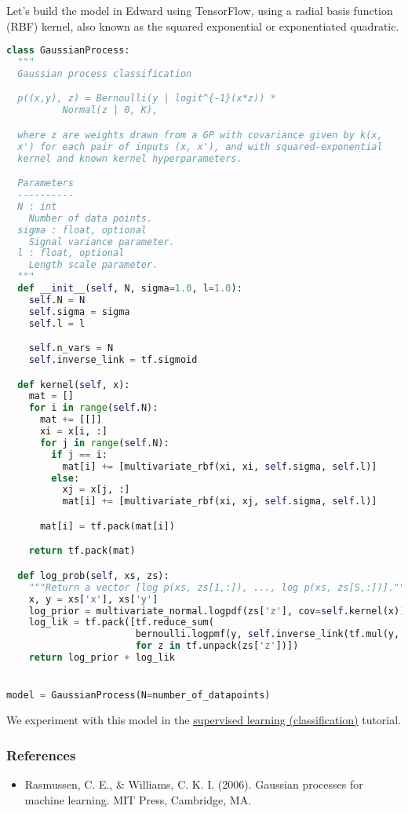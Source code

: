 Let's build the model in Edward using TensorFlow, using a radial basis function
(RBF) kernel, also known as the squared exponential or exponentiated quadratic.
\begin{lstlisting}[language=Python]
class GaussianProcess:
  """
  Gaussian process classification

  p((x,y), z) = Bernoulli(y | logit^{-1}(x*z)) *
          Normal(z | 0, K),

  where z are weights drawn from a GP with covariance given by k(x,
  x') for each pair of inputs (x, x'), and with squared-exponential
  kernel and known kernel hyperparameters.

  Parameters
  ----------
  N : int
    Number of data points.
  sigma : float, optional
    Signal variance parameter.
  l : float, optional
    Length scale parameter.
  """
  def __init__(self, N, sigma=1.0, l=1.0):
    self.N = N
    self.sigma = sigma
    self.l = l

    self.n_vars = N
    self.inverse_link = tf.sigmoid

  def kernel(self, x):
    mat = []
    for i in range(self.N):
      mat += [[]]
      xi = x[i, :]
      for j in range(self.N):
        if j == i:
          mat[i] += [multivariate_rbf(xi, xi, self.sigma, self.l)]
        else:
          xj = x[j, :]
          mat[i] += [multivariate_rbf(xi, xj, self.sigma, self.l)]

      mat[i] = tf.pack(mat[i])

    return tf.pack(mat)

  def log_prob(self, xs, zs):
    """Return a vector [log p(xs, zs[1,:]), ..., log p(xs, zs[S,:])]."""
    x, y = xs['x'], xs['y']
    log_prior = multivariate_normal.logpdf(zs['z'], cov=self.kernel(x))
    log_lik = tf.pack([tf.reduce_sum(
                       bernoulli.logpmf(y, self.inverse_link(tf.mul(y, z))))
                       for z in tf.unpack(zs['z'])])
    return log_prior + log_lik


model = GaussianProcess(N=number_of_datapoints)
\end{lstlisting}

We experiment with this model in the
\href{tut_supervised_classification}{supervised learning (classification)} tutorial.

\subsubsection{References}\label{references}

\begin{itemize}
\item
  Rasmussen, C. E., \& Williams, C. K. I. (2006). Gaussian processes
  for machine learning. MIT Press, Cambridge, MA.
\end{itemize}
